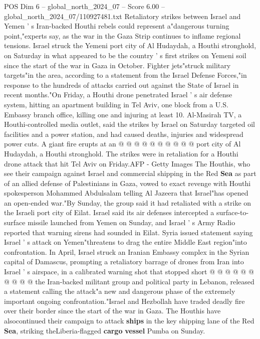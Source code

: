 \begin{textsample}{POS Dim 6 – global\_north\_2024\_07 – Score 6.00 – global\_north\_2024\_07/110927481.txt}  \label{ex:f6_pos_310}
Retaliatory strikes between Israel and Yemen ' s Iran-backed Houthi rebels could represent a"dangerous turning point,"experts say, as the war in the Gaza Strip continues to inflame regional tensions.
Israel struck the Yemeni port city of Al Hudaydah, a Houthi stronghold, on Saturday in what appeared to be the country ' s first strikes on Yemeni soil since the start of the war in Gaza in October.
Fighter jets"struck military targets"in the area, according to a statement from the Israel Defense Forces,"in response to the hundreds of attacks carried out against the State of Israel in recent months."On Friday, a Houthi drone penetrated Israel ' s air defense system, hitting an apartment building in Tel Aviv, one block from a U.S.
Embassy branch office, killing one and injuring at least 10.
Al-Masirah TV, a Houthi-controlled media outlet, said the strikes by Israel on Saturday targeted oil facilities and a power station, and had caused deaths, injuries and widespread power cuts.
A giant fire erupts at an @ @ @ @ @ @ @ @ @ @ port city of Al Hudaydah, a Houthi stronghold.
The strikes were in retaliation for a Houthi drone attack that hit Tel Aviv on Friday.AFP - Getty Images The Houthis, who see their campaign against Israel and commercial shipping in the Red \textbf{Sea} as part of an allied defense of Palestinians in Gaza, vowed to exact revenge with Houthi spokesperson Mohammed Abdulsalam telling Al Jazeera that Israel"has opened an open-ended war."By Sunday, the group said it had retaliated with a strike on the Israeli port city of Eilat.
Israel said its air defenses intercepted a surface-to-surface missile launched from Yemen on Sunday, and Israel ' s Army Radio reported that warning sirens had sounded in Eilat.
Syria issued statement saying Israel ' s attack on Yemen"threatens to drag the entire Middle East region"into confrontation.
In April, Israel struck an Iranian Embassy complex in the Syrian capital of Damascus, prompting a retaliatory barrage of drones from Iran into Israel ' s airspace, in a calibrated warning shot that stopped short @ @ @ @ @ @ @ @ @ @ the Iran-backed militant group and political party in Lebanon, released a statement calling the attack"a new and dangerous phase of the extremely important ongoing confrontation."Israel and Hezbollah have traded deadly fire over their border since the start of the war in Gaza.
The Houthis have alsocontinued their campaign to attack \textbf{ships} in the key shipping lane of the Red \textbf{Sea}, striking theLiberia-flagged \textbf{cargo} \textbf{vessel} Pumba on Sunday.

\end{textsample}

